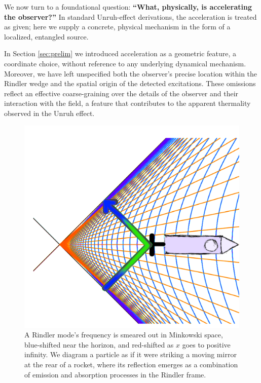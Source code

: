 \documentclass[12pt,a4paper]{article}
\begin{document}
We now turn to a foundational question: {\bf ``What, physically, is accelerating the observer?''} In standard Unruh-effect derivations, the acceleration is treated as given; here we supply a concrete, physical mechanism in the form of a localized, entangled source.

In Section \ref{sec:prelim} we introduced acceleration as a geometric feature, a coordinate choice, without reference to any underlying dynamical mechanism. Moreover, we have left unspecified both the observer’s precise location within the Rindler wedge and the spatial origin of the detected excitations. These omissions reflect an effective coarse-graining over the details of the observer and their interaction with the field, a feature that contributes to the apparent thermality observed in the Unruh effect.

\begin{figure}[h]
\centering
\includegraphics[scale=1.0]{emit_absorb.png}
\captionsetup{width=0.7\textwidth}
\caption{A Rindler mode's frequency is smeared out in Minkowski space, blue-shifted near the horizon, and red-shifted as $x$ goes to positive infinity. We diagram a particle as if it were striking a moving mirror at the rear of a rocket, where its reflection emerges as a combination of emission and absorption processes in the Rindler frame.}
\label{emit_absorb}
\end{figure}
\end{document}
